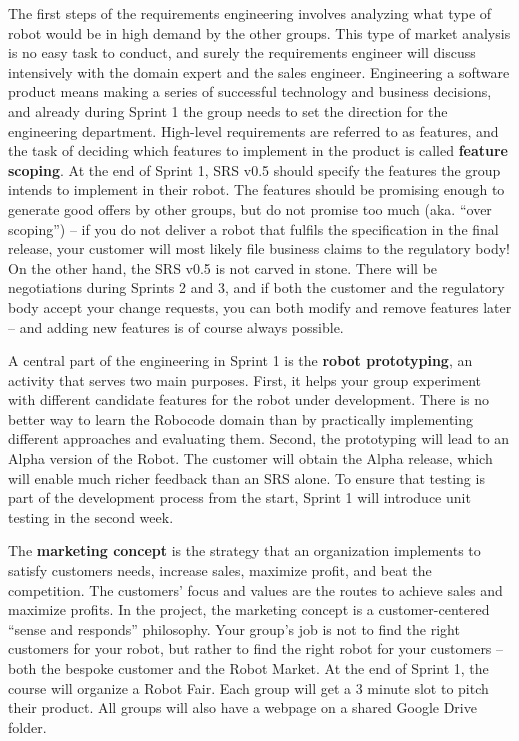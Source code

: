 \documentclass{scrreprt}
\begin{document}
The first steps of the requirements engineering involves analyzing what type of robot would be in high demand by the other groups. This type of market analysis is no easy task to conduct, and surely the requirements engineer will discuss intensively with the domain expert and the sales engineer. Engineering a software product means making a series of successful technology and business decisions, and already during Sprint 1 the group needs to set the direction for the engineering department. High-level requirements are referred to as features, and the task of deciding which features to implement in the product is called \textbf{feature scoping}. At the end of Sprint 1, SRS v0.5 should specify the features the group intends to implement in their robot. The features should be promising enough to generate good offers by other groups, but do not promise too much (aka. ``over scoping'') -- if you do not deliver a robot that fulfils the specification in the final release, your customer will most likely file business claims to the regulatory body! On the other hand, the SRS v0.5 is not carved in stone. There will be negotiations during Sprints 2 and 3, and if both the customer and the regulatory body accept your change requests, you can both modify and remove features later -- and adding new features is of course always possible.

A central part of the engineering in Sprint 1 is the \textbf{robot prototyping}, an activity that serves two main purposes. First, it helps your group experiment with different candidate features for the robot under development. There is no better way to learn the Robocode domain than by practically implementing different approaches and evaluating them. Second, the prototyping will lead to an Alpha version of the Robot. The customer will obtain the Alpha release, which will enable much richer feedback than an SRS alone. To ensure that testing is part of the development process from the start, Sprint 1 will introduce unit testing in the second week.

The \textbf{marketing concept} is the strategy that an organization implements to satisfy customers needs, increase sales, maximize profit, and beat the competition. The customers' focus and values are the routes to achieve sales and maximize profits. In the project, the marketing concept is a customer-centered ``sense and responds'' philosophy. Your group's job is not to find the right customers for your robot, but rather to find the right robot for your customers -- both the bespoke customer and the Robot Market. At the end of Sprint 1, the course will organize a Robot Fair. Each group will get a 3 minute slot to pitch their product. All groups will also have a webpage on a shared Google Drive folder.
\end{document}
